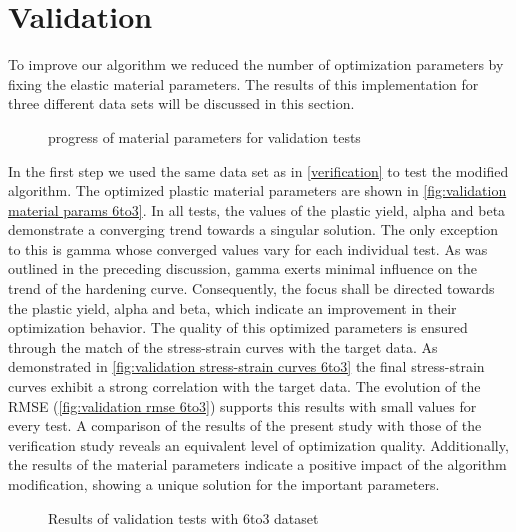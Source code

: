     
    \section{Validation}
    To improve our algorithm we reduced the number of optimization parameters by fixing the elastic material parameters. The results of this implementation for three different data sets will be discussed in this section.

    \begin{figure}[H]
		\centering
		\def\svgwidth{0.7\textwidth}
        
		\caption{progress of material parameters for validation tests}
		\label{fig:validation material params 6to3}
	\end{figure}

    In the first step we used the same data set as in \autoref{verification} to test the modified algorithm. The optimized plastic material parameters are shown in \autoref{fig:validation material params 6to3}.  In all tests, the values of the plastic yield, alpha and beta demonstrate a converging trend towards a singular solution. The only exception to this is gamma whose converged values vary for each individual test. As was outlined in the preceding discussion, gamma exerts minimal influence on the trend of the hardening curve. Consequently, the focus shall be directed towards the plastic yield, alpha and beta, which indicate an improvement in their optimization behavior.
    The quality of this optimized parameters is ensured through the match of the stress-strain curves with the target data. As demonstrated in \autoref{fig:validation stress-strain curves 6to3} the final stress-strain curves exhibit a strong correlation with the target data. The evolution of the RMSE (\autoref{fig:validation rmse 6to3}) supports this results with small values for every test. A comparison of the results of the present study with those of the verification study reveals an equivalent level of optimization quality. Additionally, the results of the material parameters indicate a positive impact of the algorithm modification, showing a unique solution for the important parameters. 
    
    \begin{figure}[H]
        \centering
        \caption{Results of validation tests with 6to3 dataset}
        \label{fig:validation results 6to3}
    \end{figure}

